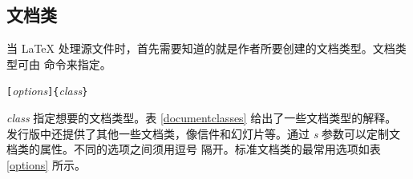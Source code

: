 \subsection{文档类}\label{sec:documentclass}


当 \LaTeX{} 处理源文件时，首先需要知道的就是作者所要创建的文档类型。文档类型可由  命令来指定。
\begin{lscommand}
\verb|[|\emph{options}\verb|]{|\emph{class}\verb|}|
\end{lscommand}

\noindent
\emph{class} 指定想要的文档类型。表 \ref{documentclasses} 给出了一些文档类型的解释。\LaTeXe{} 发行版中还提供了其他一些文档类，像信件和幻灯片等。通过 \emph{s} 参数可以定制文档类的属性。不同的选项之间须用逗号
隔开。标准文档类的最常用选项如表 \ref{options} 所示。

